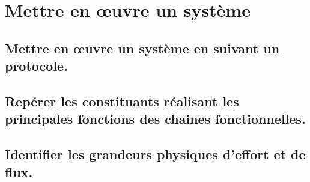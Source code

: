 \documentclass[10pt,fleqn]{article}
\newcommand{\repRel}{../..}
\newcommand{\repStyle}{\repRel/Style}
\newcommand{\td}{fichier_td}
\newcommand{\repExos}{\repRel/ExercicesCompetences}
\newcommand{\repExo}{dossier}
\begin{document}
\renewcommand{\repExo}{\repExos/C2_MettreEnOeuvreDemarche/C2_09_DeterminerLoiMouvement_TEC/64_EPAS}
\renewcommand{\td}{64_EPAS}
\graphicspath{{\repStyle/png/}{\repExo/images/}}


\renewcommand{\repExo}{\repExos/C3_ResolutionNumerique/C3_02_Euler/1021_Euler}
\renewcommand{\td}{1021_Euler}
\graphicspath{{\repStyle/png/}{\repExo/images/}}


\renewcommand{\repExo}{\repExos/C3_ResolutionNumerique/C3_02_Euler/1022_Euler}
\renewcommand{\td}{1022_Euler}
\graphicspath{{\repStyle/png/}{\repExo/images/}}


\renewcommand{\repExo}{\repExos/C3_ResolutionNumerique/C3_02_Euler/1023_Euler}
\renewcommand{\td}{1023_Euler}
\graphicspath{{\repStyle/png/}{\repExo/images/}}


\proffalse
\newpage
\def\xxchapitre{Expérimenter}
\def\xxactivite{D}
\setcounter{section}{0}
\setcounter{numexo}{0}


\section{Mettre en œuvre un système} 

\subsection{Mettre en œuvre un système en suivant un protocole.} 

\begin{multicols}{2} 

\end{multicols}

\subsection{Repérer les constituants réalisant les principales fonctions des chaines fonctionnelles.} 

\begin{multicols}{2} 

\end{multicols}

\subsection{Identifier les grandeurs physiques d’effort et de flux.} 

\begin{multicols}{2} 

\end{multicols}
\end{document}
